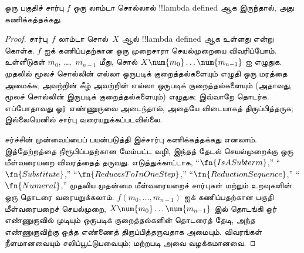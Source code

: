 \documentclass[../../../include/open-logic-section]{subfiles}
\begin{document}

\begin{thm}
ஒரு பகுதிச் சார்பு $f$ ஒரு லாம்டா சொல்லால் !!{lambda defined} ஆக இருந்தால்,
அது கணிக்கத்தக்கது.
\end{thm}

\begin{proof}
சார்பு~$f$ லாம்டா சொல்~$X$ ஆல் !!{lambda defined} ஆக உள்ளது என்று கொள்க. $f$ ஐக்
கணிப்பதற்கான ஒரு முறைசாரா செயல்முறையை விவரிப்போம். உள்ளீடுகள் $m_0$,
\dots,~$m_{n-1}$ மீது, சொல் $X \num{m_0} \ldots \num{m_{n-1}}$ ஐ எழுதுக.
முதலில் மூலச் சொல்லின் எல்லா ஒருபடிக் குறைத்தல்களையும் எழுதி ஒரு மரத்தை
அமைக்க; அவற்றின் கீழ் அவற்றின் எல்லா ஒருபடிக் குறைத்தல்களையும் (அதாவது,
மூலச் சொல்லின் இருபடிக் குறைத்தல்களையும்) எழுதுக; இவ்வாறே தொடர்க. எப்போதாவது
ஓர் எண்ணுருவை அடைந்தால், அதையே விடையாகத் திருப்பித்தருக; இல்லையெனில் சார்பு
வரையறுக்கப்படவில்லை.

சர்ச்சின் முன்வைப்பைப் பயன்படுத்தி இச்சார்பு கணிக்கத்தக்கது எனலாம். இத்தேற்றத்தை
நிரூபிப்பதற்கான மேம்பட்ட வழி, இந்தத் தேடல் செயல்முறைக்கு ஒரு மீள்வரையறை
விவரத்தைத் தருவது. எடுத்துக்காட்டாக, ``$\fn{IsASubterm}$,''
``$\fn{Substitute}$,'' ``$\fn{ReducesToInOneStep}$,''
``$\fn{ReductionSequence}$,'' ``$\fn{Numeral}$,'' முதலிய முதன்மை
மீள்வரையறைச் சார்புகள் மற்றும் உறவுகளின் ஒரு தொடரை வரையறுக்கலாம்.
$f(m_0, \dots, m_{n-1})$ ஐக் கணிப்பதற்கான பகுதி மீள்வரையறைச் செயல்முறை,
$X \num{m_0} \dots \num{m_{n-1}}$ இல் தொடங்கி ஓர் எண்ணுருவில் முடியும்
ஒருபடிக் குறைத்தல்களின் தொடரைத் தேடி, அந்த எண்ணுருவிற்கு ஒத்த எண்ணைத்
திருப்பித்தருவதாக அமையும். விவரங்கள் நீளமானவையும் சலிப்பூட்டுபவையும்;
மற்றபடி அவை வழக்கமானவை.
\end{proof}
\end{document}
